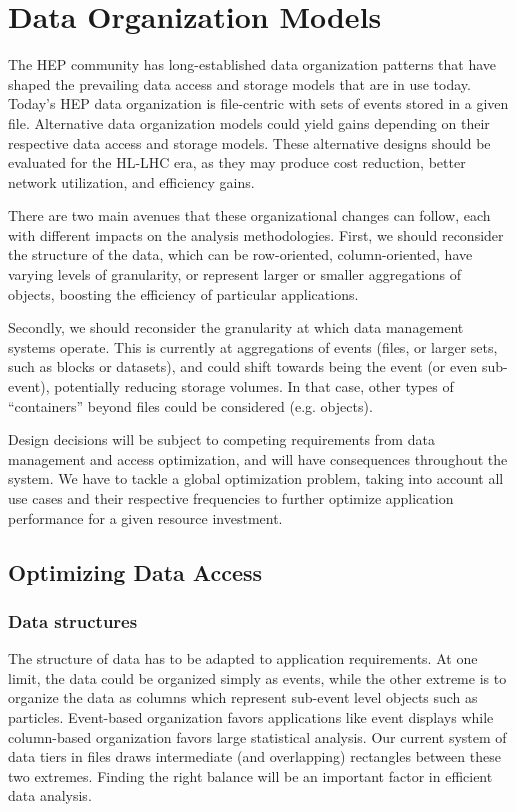 \documentclass[12pt,a4paper]{article}
\begin{document}
\section{Data Organization Models}\label{data-organization-models}

The HEP community has long-established data organization patterns that have
shaped the prevailing data access and storage
models that are in use today. Today's HEP data organization is file-centric with sets of events stored in a given file. Alternative data organization models could yield gains depending on their respective data access and storage models. These
alternative designs should be evaluated for the HL-LHC era, as they may produce cost reduction, better network utilization, and efficiency gains.

There are two main avenues that these organizational changes can follow,
each with different impacts on the analysis methodologies. First, we
should reconsider the structure of the data, which can be row-oriented,
column-oriented, have varying levels of granularity, or represent larger or
smaller aggregations of objects, boosting the efficiency of
particular applications.

Secondly, we should reconsider the granularity at which data management
systems operate. This is currently at aggregations of events (files, or
larger sets, such as blocks or datasets), and could shift towards being
the event (or even sub-event), potentially reducing storage volumes. In
that case, other types of ``containers'' beyond files could be considered
(e.g. objects).

Design decisions will be subject to competing requirements from data
management and access optimization, and will have consequences
throughout the system. We have to tackle a global optimization problem,
taking into account all use cases and their respective frequencies to
further optimize application performance for a given resource
investment.

\subsection{Optimizing Data Access}\label{optimizing-data-access}

\subsubsection{Data structures}\label{data-structures}

The structure of data has to be adapted to application requirements.
At one limit, the data could be organized simply as events, while the other
extreme is to organize the data as columns which represent sub-event
level objects such as particles. Event-based organization favors
applications like event displays while column-based organization favors
large statistical analysis. Our current system of data tiers in files
draws intermediate (and overlapping) rectangles between these two
extremes. Finding the right balance will be an important factor in
efficient data analysis.
\end{document}

